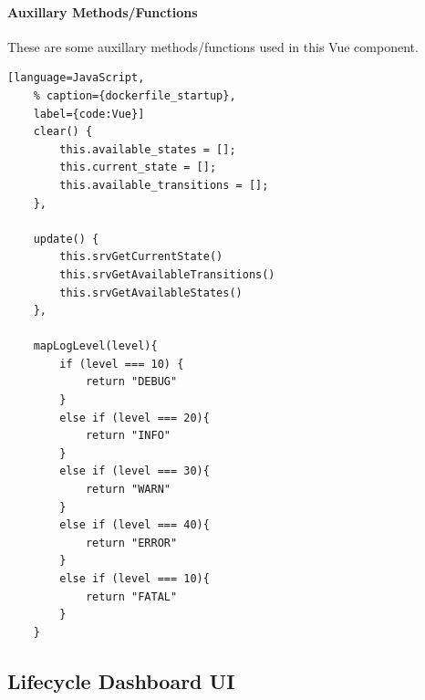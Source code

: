 \paragraph{Auxillary Methods/Functions} These are some auxillary methods/functions used in this Vue component.
\label{Implementation:Auxillary functions}
\begin{lstlisting}[language=JavaScript,
	% caption={dockerfile_startup}, 
	label={code:Vue}]
	clear() {
		this.available_states = [];
		this.current_state = [];
		this.available_transitions = [];
	},

	update() {
		this.srvGetCurrentState()
		this.srvGetAvailableTransitions()
		this.srvGetAvailableStates()
	},

	mapLogLevel(level){
		if (level === 10) {
			return "DEBUG"
		} 
		else if (level === 20){
			return "INFO"
		}
		else if (level === 30){
			return "WARN"
		}
		else if (level === 40){
			return "ERROR"
		}
		else if (level === 10){
			return "FATAL"
		}
	}
\end{lstlisting}
		

\subsection{Lifecycle Dashboard UI}

